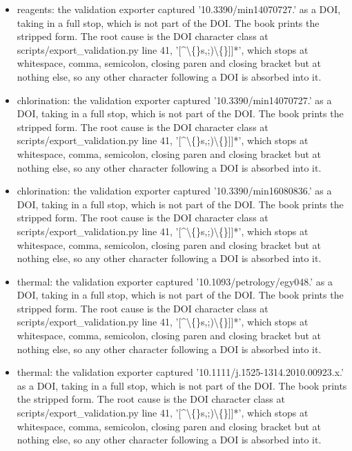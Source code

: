 \documentclass[10pt,a4paper,twoside]{report}
\begin{document}
\begin{itemize}
\item reagents: the validation exporter captured '10.3390/min14070727.' as a DOI, taking in a full stop, which is not part of the DOI. The book prints the stripped form. The root cause is the DOI character class at scripts/export\_validation.py line 41, '[\textasciicircum{}\textbackslash\{\}s,;)\textbackslash\{\}]]*', which stops at whitespace, comma, semicolon, closing paren and closing bracket but at nothing else, so any other character following a DOI is absorbed into it.

\item chlorination: the validation exporter captured '10.3390/min14070727.' as a DOI, taking in a full stop, which is not part of the DOI. The book prints the stripped form. The root cause is the DOI character class at scripts/export\_validation.py line 41, '[\textasciicircum{}\textbackslash\{\}s,;)\textbackslash\{\}]]*', which stops at whitespace, comma, semicolon, closing paren and closing bracket but at nothing else, so any other character following a DOI is absorbed into it.

\item chlorination: the validation exporter captured '10.3390/min16080836.' as a DOI, taking in a full stop, which is not part of the DOI. The book prints the stripped form. The root cause is the DOI character class at scripts/export\_validation.py line 41, '[\textasciicircum{}\textbackslash\{\}s,;)\textbackslash\{\}]]*', which stops at whitespace, comma, semicolon, closing paren and closing bracket but at nothing else, so any other character following a DOI is absorbed into it.

\item thermal: the validation exporter captured '10.1093/petrology/egy048.' as a DOI, taking in a full stop, which is not part of the DOI. The book prints the stripped form. The root cause is the DOI character class at scripts/export\_validation.py line 41, '[\textasciicircum{}\textbackslash\{\}s,;)\textbackslash\{\}]]*', which stops at whitespace, comma, semicolon, closing paren and closing bracket but at nothing else, so any other character following a DOI is absorbed into it.

\item thermal: the validation exporter captured '10.1111/j.1525-1314.2010.00923.x.' as a DOI, taking in a full stop, which is not part of the DOI. The book prints the stripped form. The root cause is the DOI character class at scripts/export\_validation.py line 41, '[\textasciicircum{}\textbackslash\{\}s,;)\textbackslash\{\}]]*', which stops at whitespace, comma, semicolon, closing paren and closing bracket but at nothing else, so any other character following a DOI is absorbed into it.


\end{itemize}
\end{document}
